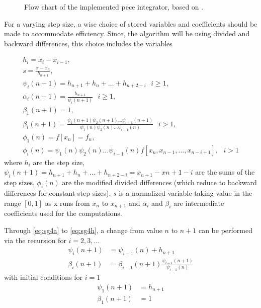 \begin{figure}[ht]
  \centering
  
  \caption{Flow chart of the implemented \gls{pece} integrator, based 
    on \cite{Shampine1975}.}
  \label{fig:sgode}
\end{figure}

For a varying step size, a wise choice of stored variables and coefficients 
should be made to accommodate efficiency. Since, the algorithm will be using divided 
and backward differences, this choice includes the variables

\begin{gather}
  h_i  = x_i - x_{i-1}, \label{eq:sg4a}\\
  s    = \frac{x - x_n}{h_{n+1}}, \label{eq:sg4b}\\
  \psi _i (n+1)   = h_{n+1} + h_{n} + \dots + h_{n+2-i} \text{ } i \ge 1, \label{eq:sg4c}\\
  \alpha _i (n+1) = \frac{h_{n+1}}{\psi _i (n+1)} \text{ } i \ge 1, \label{eq:sg4d}\\
  \beta _1 (n+1)  = 1, \label{eq:sg4e}\\
  \beta _i (n+1)  = \frac{\psi _1 (n+1) \psi _2 (n+1) \dots \psi _{i-1}(n+1)}{\psi _1 (n) \psi _2 (n) \dots \psi _{i-1}(n)} \text{ } i > 1, \label{eq:sg4f}\\
  \phi _1(n) = f[x_n] = f_n, \label{eq:sg4g}\\
  \phi _i(n) = \psi _1 (n) \psi _2 (n) \dots \psi _{i-1}(n) f[x_n,x_{n-1},\dots ,x_{n-i+1}], \text{ } i > 1 \label{eq:sg4h}
\end{gather}
where $h_i$ are the step size, 
$\psi _i(n+1) = h_{n+1} + h_{n} + \dots + h_{n+2-i} = x_{n+1}-x{n+1-i}$ are the 
sums of the step sizes, $\phi _{i}(n)$ are the modified divided differences (which 
reduce to backward differences for constant step sizes), $s$ is a normalized variable 
taking value in the range $[0,1]$ as x runs from $x_n$ to $x_{n+1}$ and $\alpha _i$ 
and $\beta _i$ are intermediate coefficients used for the computations.

Through \autoref{eq:sg4a} to \autoref{eq:sg4h}, a change from value $n$ to $n+1$ 
can be performed via the recursion for $i=2,3,\dots$
\begin{equation}
  \begin{aligned}
    \psi _i(n+1)   &= \psi _{i-1}(n) + h_{n+1} \\
    \beta _i(n+1)  &= \beta _{i-1}(n+1) \frac{\psi _{i-1}(n+1)}{\psi _{i-1}(n)}
  \end{aligned}
\end{equation}
with initial conditions for $i=1$
\begin{equation}
  \begin{aligned}
    \psi _1(n+1)   &= h_{n+1} \\
    \beta _1(n+1)  &= 1
  \end{aligned}
\end{equation}

